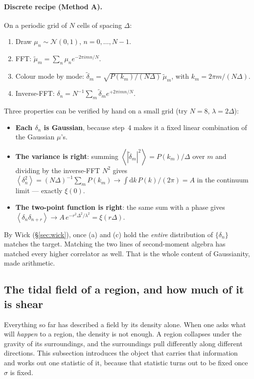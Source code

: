 \documentclass[12pt]{article}
\newcommand{\avg}[1]{\left\langle #1 \right\rangle}
\begin{document}
\paragraph{Discrete recipe (Method A).}  On a periodic grid of $N$ cells
of spacing $\Delta$:
\begin{enumerate}
  \item Draw $\mu_n \sim \mathcal N(0,1)$, $n = 0,\dots,N-1$.
  \item FFT: $\tilde\mu_m = \sum_n \mu_n e^{-2\pi i mn/N}$.
  \item Colour mode by mode: $\tilde\delta_m =
        \sqrt{P(k_m)/(N\Delta)}\,\tilde\mu_m$, with $k_m = 2\pi m/(N\Delta)$.
  \item Inverse-FFT: $\delta_n = N^{-1}\sum_m \tilde\delta_m e^{+2\pi i mn/N}$.
\end{enumerate}
Three properties can be verified by hand on a small grid (try $N = 8$,
$\lambda = 2\Delta$):
\begin{itemize}
  \item[(a)] \textbf{Each $\delta_n$ is Gaussian}, because step~4 makes it
        a fixed linear combination of the Gaussian $\mu$'s.
  \item[(b)] \textbf{The variance is right}: summing
        $\avg{|\tilde\delta_m|^2} = P(k_m)/\Delta$ over $m$ and dividing
        by the inverse-FFT $N^2$ gives $\avg{\delta_n^2} = (N\Delta)^{-1}
        \sum_m P(k_m) \to \int\mathrm dk\,P(k)/(2\pi) = A$ in the
        continuum limit --- exactly $\xi(0)$.
  \item[(c)] \textbf{The two-point function is right}: the same sum with
        a phase gives $\avg{\delta_n\delta_{n+r}} \to A\,e^{-r^2\Delta^2/
        \lambda^2} = \xi(r\Delta)$.
\end{itemize}
By Wick (\S\ref{sec:wick}), once (a) and (c) hold the \emph{entire}
distribution of $\{\delta_n\}$ matches the target.  Matching the two
lines of second-moment algebra has matched every higher
correlator as well.  That is the whole content of Gaussianity, made arithmetic.

\subsection{The tidal field of a region, and how much of it is shear}
\label{sec:tidal}

Everything so far has described a field by its density alone.  When one
asks what will \emph{happen} to a region, the density is not enough.  A
region collapses under the gravity of its surroundings, and the
surroundings pull differently along different directions.  This
subsection introduces the object that carries that information and works
out one statistic of it, because that statistic turns out to be fixed
once $\sigma$ is fixed.
\end{document}
